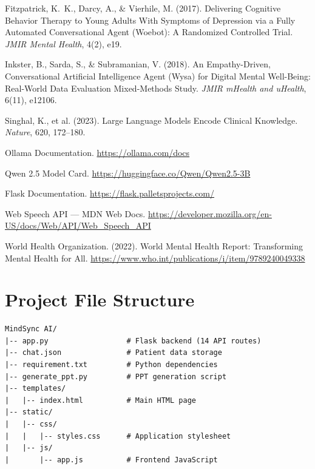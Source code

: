 \documentclass[12pt,a4paper]{report}
\begin{document}
\begin{enumerate}[label={[\arabic*]}]
    \item Fitzpatrick, K.\ K., Darcy, A., \& Vierhile, M. (2017). Delivering Cognitive Behavior Therapy to Young Adults With Symptoms of Depression via a Fully Automated Conversational Agent (Woebot): A Randomized Controlled Trial. \textit{JMIR Mental Health}, 4(2), e19.

    \item Inkster, B., Sarda, S., \& Subramanian, V. (2018). An Empathy-Driven, Conversational Artificial Intelligence Agent (Wysa) for Digital Mental Well-Being: Real-World Data Evaluation Mixed-Methods Study. \textit{JMIR mHealth and uHealth}, 6(11), e12106.

    \item Singhal, K., et al. (2023). Large Language Models Encode Clinical Knowledge. \textit{Nature}, 620, 172--180.

    \item Ollama Documentation. \url{https://ollama.com/docs}

    \item Qwen 2.5 Model Card. \url{https://huggingface.co/Qwen/Qwen2.5-3B}

    \item Flask Documentation. \url{https://flask.palletsprojects.com/}

    \item Web Speech API --- MDN Web Docs. \url{https://developer.mozilla.org/en-US/docs/Web/API/Web_Speech_API}

    \item World Health Organization. (2022). World Mental Health Report: Transforming Mental Health for All. \url{https://www.who.int/publications/i/item/9789240049338}
\end{enumerate}

\appendix
\chapter{Project File Structure}

\begin{verbatim}
MindSync AI/
|-- app.py                  # Flask backend (14 API routes)
|-- chat.json               # Patient data storage
|-- requirement.txt         # Python dependencies
|-- generate_ppt.py         # PPT generation script
|-- templates/
|   |-- index.html          # Main HTML page
|-- static/
|   |-- css/
|   |   |-- styles.css      # Application stylesheet
|   |-- js/
|       |-- app.js          # Frontend JavaScript
\end{verbatim}
\end{document}
